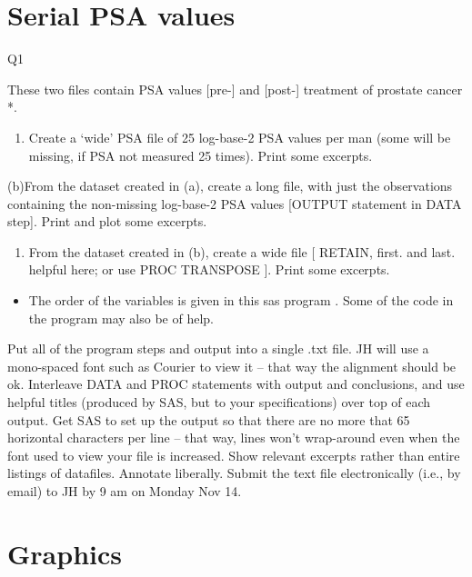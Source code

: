 \documentclass[]{book}
\providecommand{\tightlist}{%
  \setlength{\itemsep}{0pt}\setlength{\parskip}{0pt}}
\begin{document}
\hypertarget{serial-psa-values-1}{%
\section{Serial PSA values}\label{serial-psa-values-1}}

Q1

These two files contain PSA values {[}pre-{]} and {[}post-{]} treatment of prostate cancer *.

\begin{enumerate}
\def\labelenumi{(\alph{enumi})}
\tightlist
\item
  Create a `wide' PSA file of 25 log-base-2 PSA values per man (some will be missing, if PSA not measured 25 times). Print some excerpts.
\end{enumerate}

(b)From the dataset created in (a), create a long file, with just the observations containing the non-missing log-base-2 PSA values {[}OUTPUT statement in DATA step{]}. Print and plot some excerpts.

\begin{enumerate}
\def\labelenumi{(\alph{enumi})}
\setcounter{enumi}{2}
\tightlist
\item
  From the dataset created in (b), create a wide file {[} RETAIN, first. and last. helpful here; or use PROC TRANSPOSE {]}. Print some excerpts.
\end{enumerate}

\begin{itemize}
\tightlist
\item
  The order of the variables is given in this sas program . Some of the code in the program may also be of help.
\end{itemize}

Put all of the program steps and output into a single .txt file. JH will use a mono-spaced font such as Courier to view it -- that way the alignment should be ok. Interleave DATA and PROC statements with output and conclusions, and use helpful titles (produced by SAS, but to your specifications) over top of each output. Get SAS to set up the output so that there are no more that 65 horizontal characters per line -- that way, lines won't wrap-around even when the font used to view your file is increased. Show relevant excerpts rather than entire listings of datafiles. Annotate liberally. Submit the text file electronically (i.e., by email) to JH by 9 am on Monday Nov 14.

\hypertarget{graphics-1}{%
\section{Graphics}\label{graphics-1}}
\end{document}
